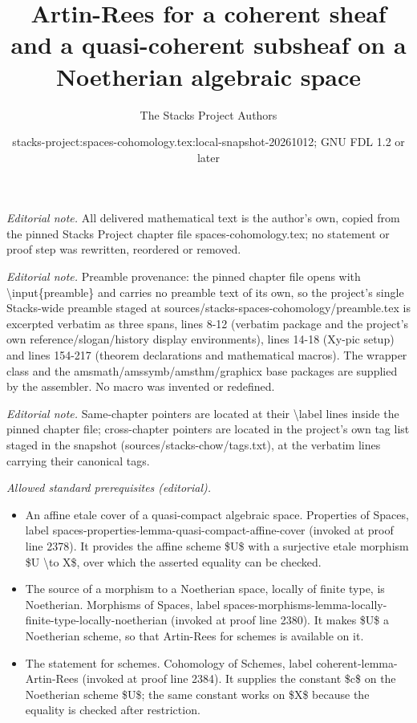 \documentclass[10pt,a4paper]{amsart}
\title{Artin-Rees for a coherent sheaf and a quasi-coherent subsheaf on a Noetherian algebraic space}
\author{The Stacks Project Authors}
\date{stacks-project:spaces-cohomology.tex:local-snapshot-20261012; GNU FDL 1.2 or later}
\theoremstyle{plain}
\theoremstyle{definition}
\theoremstyle{remark}
\numberwithin{equation}{subsection}
\begin{document}
\maketitle
\noindent\textit{Editorial note.} All delivered mathematical text is the author's own, copied from the pinned Stacks Project chapter file spaces-cohomology.tex; no statement or proof step was rewritten, reordered or removed.\par\medskip
\noindent\textit{Editorial note.} Preamble provenance: the pinned chapter file opens with \textbackslash{}input\{preamble\} and carries no preamble text of its own, so the project's single Stacks-wide preamble staged at sources/stacks-spaces-cohomology/preamble.tex is excerpted verbatim as three spans, lines 8-12 (verbatim package and the project's own reference/slogan/history display environments), lines 14-18 (Xy-pic setup) and lines 154-217 (theorem declarations and mathematical macros). The wrapper class and the amsmath/amssymb/amsthm/graphicx base packages are supplied by the assembler. No macro was invented or redefined.\par\medskip
\noindent\textit{Editorial note.} Same-chapter pointers are located at their \textbackslash{}label lines inside the pinned chapter file; cross-chapter pointers are located in the project's own tag list staged in the snapshot (sources/stacks-chow/tags.txt), at the verbatim lines carrying their canonical tags.\par\medskip
\noindent\textit{Allowed standard prerequisites (editorial).}\begin{itemize}
\item An affine etale cover of a quasi-compact algebraic space. Properties of Spaces, label spaces-properties-lemma-quasi-compact-affine-cover (invoked at proof line 2378). It provides the affine scheme \$U\$ with a surjective etale morphism \$U \textbackslash{}to X\$, over which the asserted equality can be checked.
\item The source of a morphism to a Noetherian space, locally of finite type, is Noetherian. Morphisms of Spaces, label spaces-morphisms-lemma-locally-finite-type-locally-noetherian (invoked at proof line 2380). It makes \$U\$ a Noetherian scheme, so that Artin-Rees for schemes is available on it.
\item The statement for schemes. Cohomology of Schemes, label coherent-lemma-Artin-Rees (invoked at proof line 2384). It supplies the constant \$c\$ on the Noetherian scheme \$U\$; the same constant works on \$X\$ because the equality is checked after restriction.
\end{itemize}\medskip
\end{document}
